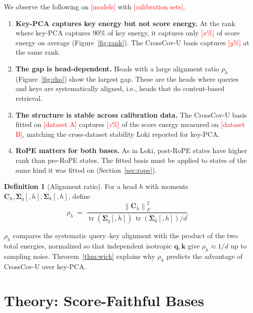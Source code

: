 \documentclass[10pt]{article}
\newcommand{\TODO}[1]{\textcolor{red}{[#1]}}
\newcommand{\tr}{\operatorname{tr}}
\newcommand{\norm}[1]{\left\lVert #1 \right\rVert}
\newcommand{\fro}[1]{\norm{#1}_F}
\newcommand{\bq}{\mathbf{q}}
\newcommand{\bk}{\mathbf{k}}
\newcommand{\bC}{\mathbf{C}}
\newcommand{\Sq}{\bm{\Sigma}_q}
\newcommand{\Sk}{\bm{\Sigma}_k}
\newcommand{\method}{CrossCov-U}
\theoremstyle{plain}
\theoremstyle{definition}
\newtheorem{definition}[theorem]{Definition}
\theoremstyle{remark}
\begin{document}
We observe the following on \TODO{models} with \TODO{calibration sets}.
\begin{enumerate}[leftmargin=*,itemsep=1pt]
  \item \textbf{Key-PCA captures key energy but not score energy.} At the
  rank where key-PCA captures 90\% of key energy, it captures only
  \TODO{$x$\%} of score energy on average (Figure~\ref{fig:rank}). The
  \method{} basis captures \TODO{$y$\%} at the same rank.
  \item \textbf{The gap is head-dependent.} Heads with a large alignment ratio
  $\rho_h$ (Figure~\ref{fig:rho}) show the largest gap. These are the heads
  where queries and keys are systematically aligned, i.e., heads that do
  content-based retrieval.
  \item \textbf{The structure is stable across calibration data.} The
  \method{} basis fitted on \TODO{dataset A} captures \TODO{$z$\%} of the
  score energy measured on \TODO{dataset B}, matching the cross-dataset
  stability Loki reported for key-PCA.
  \item \textbf{RoPE matters for both bases.} As in Loki, post-RoPE states
  have higher rank than pre-RoPE states. The fitted basis must be applied to
  states of the same kind it was fitted on (Section~\ref{sec:rope}).
\end{enumerate}

\begin{definition}[Alignment ratio]
\label{def:rho}
For a head $h$ with moments $\bC_h,\Sq[,h],\Sk[,h]$, define
\begin{equation}
  \label{eq:rho}
  \rho_h \;=\; \frac{\fro{\bC_h}^2}{\tr(\Sq[,h])\,\tr(\Sk[,h])/d}.
\end{equation}
\end{definition}
$\rho_h$ compares the systematic query--key alignment with the product of
the two total energies, normalized so that independent isotropic $\bq,\bk$
give $\rho_h\approx 1/d$ up to sampling noise. Theorem~\ref{thm:wick}
explains why $\rho_h$ predicts the advantage of \method{} over key-PCA.

\section{Theory: Score-Faithful Bases}
\label{sec:theory}
\end{document}
